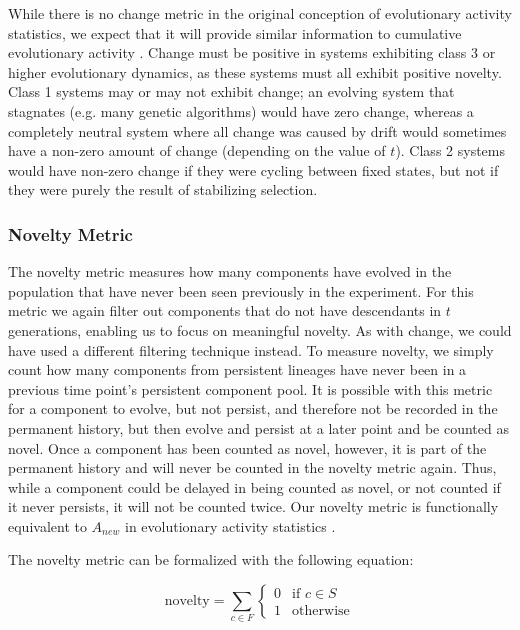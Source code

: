 \documentclass[letterpaper]{article}
\begin{document}
While there is no change metric in the original conception of evolutionary activity statistics, we expect that it will provide similar information to cumulative evolutionary activity \citep{bedau_comparison_1997}. Change must be positive in systems exhibiting class 3 or higher evolutionary dynamics, as these systems must all exhibit positive novelty. Class 1 systems may or may not exhibit change; an evolving system that stagnates (e.g. many genetic algorithms) would have zero change, whereas a completely neutral system where all change was caused by drift would sometimes have a non-zero amount of change (depending on the value of $t$). Class 2 systems would have non-zero change if they were cycling between fixed states, but not if they were purely the result of stabilizing selection.

\subsubsection{Novelty Metric}
The novelty metric measures how many components have evolved in the population that have never been seen previously in the experiment. For this metric we again filter out components that do not have descendants in $t$ generations, enabling us to focus on meaningful novelty. As with change, we could have used a different filtering technique instead. To measure novelty, we simply count how many components from persistent lineages have never been in a previous time point’s persistent component pool. It is possible with this metric for a component to evolve, but not persist, and therefore not be recorded in the permanent history, but then evolve and persist at a later point and be counted as novel. Once a component has been counted as novel, however, it is part of the permanent history and will never be counted in the novelty metric again. Thus, while a component could be delayed in being counted as novel, or not counted if it never persists, it will not be counted twice. Our novelty metric is functionally equivalent to $A_{new}$ in evolutionary activity statistics \citep{bedau_comparison_1997}.    

The novelty metric can be formalized with the following equation:

\begin{equation} \text{novelty} =    \sum_{c \in F}{\begin{cases}
      0 & \text{if } c \in S\\
      1 &  \text{otherwise}  
   \end{cases}}
\label{eq:novelty}
\end{equation}
\end{document}
